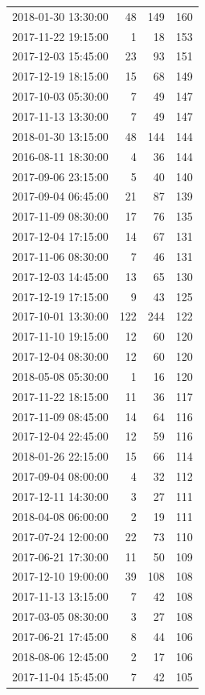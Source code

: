 \begin{tabular}{lrrr}
2018-01-30 13:30:00 & 48 & 149 & 160 \\
2017-11-22 19:15:00 & 1 & 18 & 153 \\
2017-12-03 15:45:00 & 23 & 93 & 151 \\
2017-12-19 18:15:00 & 15 & 68 & 149 \\
2017-10-03 05:30:00 & 7 & 49 & 147 \\
2017-11-13 13:30:00 & 7 & 49 & 147 \\
2018-01-30 13:15:00 & 48 & 144 & 144 \\
2016-08-11 18:30:00 & 4 & 36 & 144 \\
2017-09-06 23:15:00 & 5 & 40 & 140 \\
2017-09-04 06:45:00 & 21 & 87 & 139 \\
2017-11-09 08:30:00 & 17 & 76 & 135 \\
2017-12-04 17:15:00 & 14 & 67 & 131 \\
2017-11-06 08:30:00 & 7 & 46 & 131 \\
2017-12-03 14:45:00 & 13 & 65 & 130 \\
2017-12-19 17:15:00 & 9 & 43 & 125 \\
2017-10-01 13:30:00 & 122 & 244 & 122 \\
2017-11-10 19:15:00 & 12 & 60 & 120 \\
2017-12-04 08:30:00 & 12 & 60 & 120 \\
2018-05-08 05:30:00 & 1 & 16 & 120 \\
2017-11-22 18:15:00 & 11 & 36 & 117 \\
2017-11-09 08:45:00 & 14 & 64 & 116 \\
2017-12-04 22:45:00 & 12 & 59 & 116 \\
2018-01-26 22:15:00 & 15 & 66 & 114 \\
2017-09-04 08:00:00 & 4 & 32 & 112 \\
2017-12-11 14:30:00 & 3 & 27 & 111 \\
2018-04-08 06:00:00 & 2 & 19 & 111 \\
2017-07-24 12:00:00 & 22 & 73 & 110 \\
2017-06-21 17:30:00 & 11 & 50 & 109 \\
2017-12-10 19:00:00 & 39 & 108 & 108 \\
2017-11-13 13:15:00 & 7 & 42 & 108 \\
2017-03-05 08:30:00 & 3 & 27 & 108 \\
2017-06-21 17:45:00 & 8 & 44 & 106 \\
2018-08-06 12:45:00 & 2 & 17 & 106 \\
2017-11-04 15:45:00 & 7 & 42 & 105 \\

\end{tabular}
